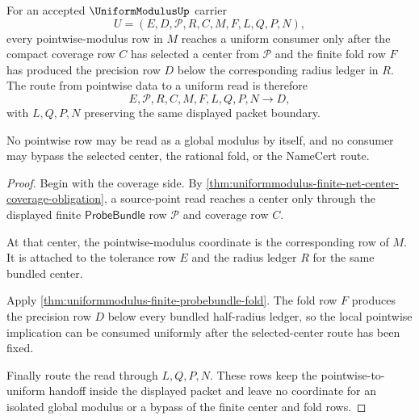 \begin{theorem}
\label{thm:uniformmodulus-pointwise-to-uniform-route-obligation}
For an accepted $\UniformModulusUp$ carrier
$$
U=(E,D,\mathcal{P},R,C,M,F,L,Q,P,N),
$$
every pointwise-modulus row in $M$ reaches a uniform consumer only after the compact coverage row $C$ has selected a center from $\mathcal{P}$ and the finite fold row $F$ has produced the precision row $D$ below the corresponding radius ledger in $R$. The route from pointwise data to a uniform read is therefore
$$
E,\mathcal{P},R,C,M,F,L,Q,P,N \to D,
$$
with $L,Q,P,N$ preserving the same displayed packet boundary.

No pointwise row may be read as a global modulus by itself, and no consumer may bypass the selected center, the rational fold, or the NameCert route.
\end{theorem}
\begin{proof}
Begin with the coverage side. By \autoref{thm:uniformmodulus-finite-net-center-coverage-obligation}, a source-point read reaches a center only through the displayed finite $\mathsf{ProbeBundle}$ row $\mathcal{P}$ and coverage row $C$.

At that center, the pointwise-modulus coordinate is the corresponding row of $M$. It is attached to the tolerance row $E$ and the radius ledger $R$ for the same bundled center.

Apply \autoref{thm:uniformmodulus-finite-probebundle-fold}. The fold row $F$ produces the precision row $D$ below every bundled half-radius ledger, so the local pointwise implication can be consumed uniformly after the selected-center route has been fixed.

Finally route the read through $L,Q,P,N$. These rows keep the pointwise-to-uniform handoff inside the displayed packet and leave no coordinate for an isolated global modulus or a bypass of the finite center and fold rows.
\end{proof}

